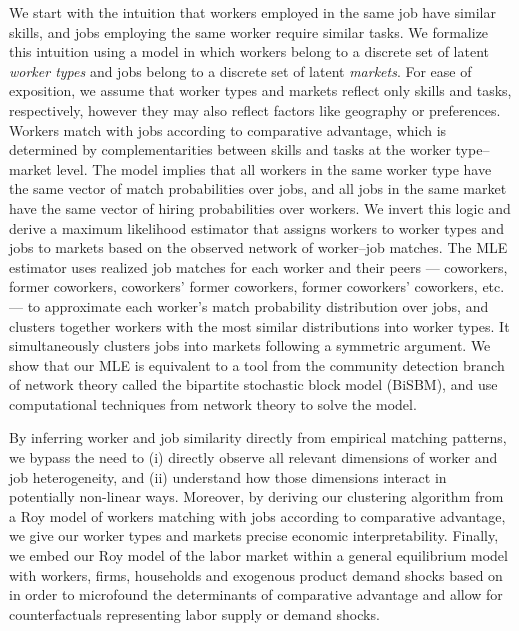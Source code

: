 \documentclass[12pt]{article}
\theoremstyle{definition}
\theoremstyle{plain}
\begin{document}
We start with the intuition that workers employed in the same job have similar skills, and jobs employing the same worker require similar tasks. We formalize this intuition using a \citet{Roy1951} model in which workers belong to a discrete set of latent \emph{worker types} and jobs belong to a discrete set of latent \emph{markets}. For ease of exposition, we assume that worker types and markets reflect only skills and tasks, respectively, however they may also reflect factors like geography or preferences.  Workers match with jobs according to comparative advantage, which is determined by complementarities between skills and tasks at the worker type--market level. The model implies that all workers in the same worker type have the same vector of match probabilities over jobs, and all jobs in the same market have the same vector of hiring probabilities over workers. We invert this logic and derive a maximum likelihood estimator that assigns workers to worker types and jobs to markets based on the observed network of worker--job matches. The MLE estimator uses realized job matches for each worker and their peers --- coworkers, former coworkers, coworkers' former coworkers, former coworkers' coworkers, etc. --- to approximate each worker's match probability distribution over jobs, and clusters together workers with the most similar distributions into worker types. It simultaneously clusters jobs into markets following a symmetric argument. We show that our MLE is equivalent to a tool from the community detection branch of network theory called the bipartite stochastic block model (BiSBM), and use computational techniques from network theory to solve the model. 


By inferring worker and job similarity directly from empirical matching patterns, we bypass the need to (i) directly observe all relevant dimensions of worker and job heterogeneity, and (ii) understand how those dimensions interact in potentially non-linear ways. Moreover, by deriving our clustering algorithm from a Roy model of workers matching with jobs according to comparative advantage, we give our worker types and markets precise economic interpretability. Finally, we embed our Roy model of the labor market within a general equilibrium model with workers, firms, households and exogenous product demand shocks based on \citet{Grigsby2019} in order to microfound the determinants of comparative advantage and allow for counterfactuals representing labor supply or demand shocks. 
\end{document}
